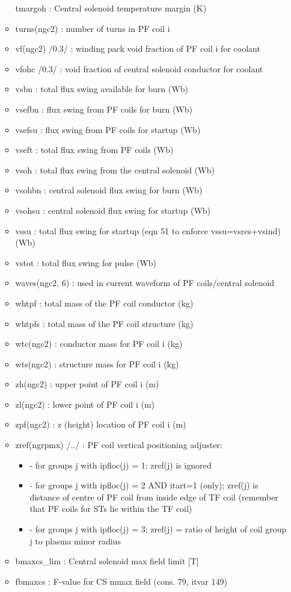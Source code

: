 \documentclass[]{article}
\providecommand{\tightlist}{%
  \setlength{\itemsep}{0pt}\setlength{\parskip}{0pt}}
\begin{document}
\begin{itemize}
\begin{itemize}
    tmargoh : Central solenoid temperature margin (K)
  \item
    turns(ngc2) : number of turns in PF coil i
  \item
    vf(ngc2) /0.3/ : winding pack void fraction of PF coil i for coolant
  \item
    vfohc /0.3/ : void fraction of central solenoid conductor for
    coolant
  \item
    vsbn : total flux swing available for burn (Wb)
  \item
    vsefbn : flux swing from PF coils for burn (Wb)
  \item
    vsefsu : flux swing from PF coils for startup (Wb)
  \item
    vseft : total flux swing from PF coils (Wb)
  \item
    vsoh : total flux swing from the central solenoid (Wb)
  \item
    vsohbn : central solenoid flux swing for burn (Wb)
  \item
    vsohsu : central solenoid flux swing for startup (Wb)
  \item
    vssu : total flux swing for startup (eqn 51 to enforce
    vssu=vsres+vsind) (Wb)
  \item
    vstot : total flux swing for pulse (Wb)
  \item
    waves(ngc2, 6) : used in current waveform of PF coils/central
    solenoid
  \item
    whtpf : total mass of the PF coil conductor (kg)
  \item
    whtpfs : total mass of the PF coil structure (kg)
  \item
    wtc(ngc2) : conductor mass for PF coil i (kg)
  \item
    wts(ngc2) : structure mass for PF coil i (kg)
  \item
    zh(ngc2) : upper point of PF coil i (m)
  \item
    zl(ngc2) : lower point of PF coil i (m)
  \item
    zpf(ngc2) : z (height) location of PF coil i (m)
  \item
    zref(ngrpmx) /../ : PF coil vertical positioning adjuster:

    \begin{itemize}
    \tightlist
    \item
      - for groups j with ipfloc(j) = 1; zref(j) is ignored
    \item
      - for groups j with ipfloc(j) = 2 AND itart=1 (only); zref(j) is
      distance of centre of PF coil from inside edge of TF coil
      (remember that PF coils for STs lie within the TF coil)
    \item
      - for groups j with ipfloc(j) = 3; zref(j) = ratio of height of
      coil group j to plasma minor radius
    \end{itemize}
  \item
    bmaxcs\_lim : Central solenoid max field limit {[}T{]}
  \item
    fbmaxcs : F-value for CS mmax field (cons. 79, itvar 149)
  \end{itemize}


\end{itemize}
\end{document}
